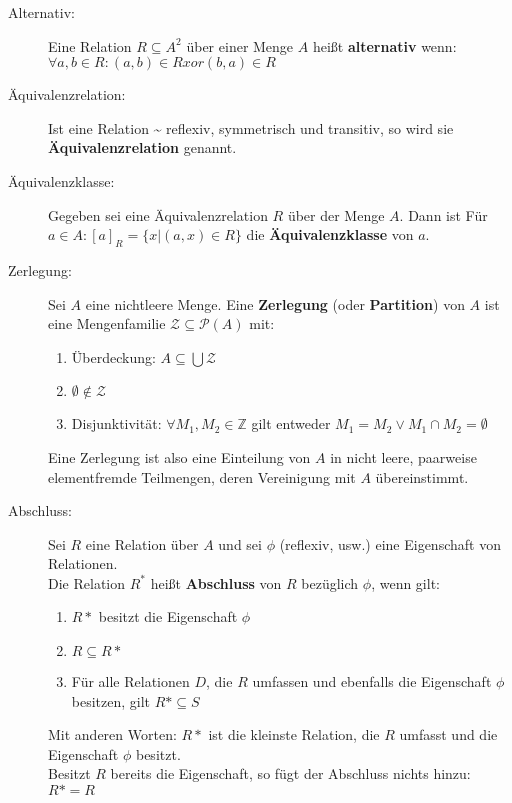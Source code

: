 \begin{description}
  \item [Alternativ:]
    Eine Relation $R \subseteq A^2$ über einer Menge $A$ heißt 
    \textbf{alternativ} wenn: \\
    $\forall a,b \in R : (a,b) \in R xor (b,a) \in R$

  \item [Äquivalenzrelation:]
    Ist eine Relation \textasciitilde{} reflexiv, symmetrisch und transitiv, 
    so wird sie \textbf{Äquivalenzrelation} genannt.

  \item [Äquivalenzklasse:]
    Gegeben sei eine Äquivalenzrelation $R$ über der Menge $A$. Dann ist Für 
    $a \in A: [a]_R = \{x | (a,x) \in R\}$ die \textbf{Äquivalenzklasse} von $a$.  

  \item [Zerlegung:]
    Sei $A$ eine nichtleere Menge. Eine \textbf{Zerlegung} (oder 
    \textbf{Partition}) von $A$ ist eine Mengenfamilie 
    $\mathcal{Z} \subseteq \mathcal{P}(A)$ mit:
    \begin{enumerate}
      \item Überdeckung: $A \subseteq \bigcup \mathcal{Z}$
      \item $\emptyset \notin \mathcal{Z}$
      \item Disjunktivität: $\forall M_1, M_2 \in \mathbb{Z}$ gilt entweder 
            $M_1 = M_2 \vee M_1 \cap M_2 = \emptyset$
    \end{enumerate}
    Eine Zerlegung ist also eine Einteilung von $A$ in nicht leere, paarweise 
    elementfremde Teilmengen, deren Vereinigung mit $A$ übereinstimmt.

  \item [Abschluss:]
    Sei $R$ eine Relation über $A$ und sei $\phi$ (reflexiv, usw.) eine 
    Eigenschaft von Relationen.\\
    Die Relation $R^*$ heißt \textbf{Abschluss} von $R$ bezüglich $\phi$, wenn 
    gilt:
    \begin{enumerate}
      \item $R*$ besitzt die Eigenschaft $\phi$
      \item $R \subseteq R*$
      \item Für alle Relationen $D$, die $R$ umfassen und ebenfalls die 
            Eigenschaft $\phi$ besitzen, gilt $R* \subseteq S$
    \end{enumerate}
    Mit anderen Worten: $R*$ ist die kleinste Relation, die $R$ umfasst und die 
    Eigenschaft $\phi$ besitzt.\\
    Besitzt $R$ bereits die Eigenschaft, so fügt der Abschluss nichts hinzu: 
    $R* = R$


\end{description}
